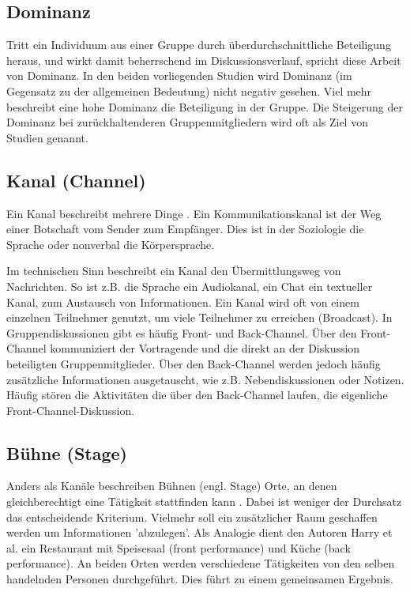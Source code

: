 \documentclass{seminarvorlage}
\begin{document}
\subsection{Dominanz}
Tritt ein Individuum aus einer Gruppe durch üb\-er\-durch\-schnitt\-liche
Beteiligung heraus, und wirkt damit beherrschend im Diskussionsverlauf, spricht
diese Arbeit von Dominanz.
In den beiden vorliegenden Studien \cite{HarGorSch2012} \cite{KimChaHolPent2008}
wird Dominanz (im Gegensatz zu der allgemeinen Bedeutung) nicht negativ gesehen.
Viel mehr beschreibt eine hohe Dominanz die Beteiligung in der Gruppe.
Die Steigerung der Dominanz bei zurückhaltenderen Gruppenmitgliedern wird oft
als Ziel von Studien genannt.

\subsection{Kanal (Channel)}
Ein Kanal beschreibt mehrere Dinge \cite{BergKara2009-1}.
Ein Kommunikationskanal ist der Weg einer Botschaft vom Sender zum
Empfänger. Dies ist in der Soziologie die Sprache oder non\-verbal die
Kör\-per\-spra\-che.

Im technischen Sinn beschreibt ein Kanal den Über\-mitt\-lungs\-weg von
Nachrichten.
So ist z.B. die Sprache ein Audiokanal, ein Chat ein textueller Kanal,
zum Austausch von Informationen. Ein Kanal wird oft von einem einzelnen
Teilnehmer genutzt, um viele Teilnehmer zu erreichen (Broadcast).
In Gruppendiskussionen gibt es häufig Front- und Back-Channel. Über den
Front-Channel kommuniziert der Vortragende und die direkt an der Diskussion
beteiligten Gruppenmitglieder. Über den Back-Channel werden jedoch häufig
zusätzliche Informationen ausgetauscht, wie z.B. Nebendiskussionen oder Notizen.
Häufig stören die Aktivitäten die über den Back-Channel laufen, die eigenliche
Front-Channel-Diskussion.

\subsection{Bühne (Stage)}
Anders als Kanäle beschreiben Bühnen (engl. Stage) Orte, an denen
gleichberechtigt eine Tätigkeit stattfinden kann \cite{Goff1959}. Dabei ist
weniger der Durchsatz das entscheidende Kriterium. Vielmehr soll ein
zusätzlicher Raum geschaffen werden um Informationen 'abzulegen'. Als Analogie dient den
Autoren Harry et al. \cite{HarGorSch2012} ein Restaurant mit Speisesaal (front performance) und Küche
(back performance).
An beiden Orten werden verschiedene Tätigkeiten von den selben handelnden
Personen durchgeführt. Dies führt zu einem gemeinsamen Ergebnis.
\end{document}
